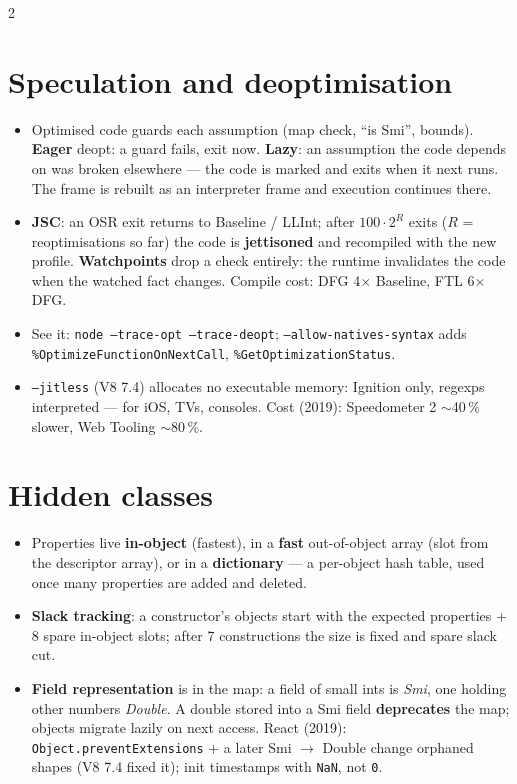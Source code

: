 \documentclass[8pt]{extarticle}
\newcommand\ct[1]{\texttt{#1}}
\begin{document}
\begin{multicols}{2}
\section{Speculation and deoptimisation}
\begin{itemize}
  \item Optimised code guards each assumption (map check, ``is Smi'', bounds). \textbf{Eager}
        deopt: a guard fails, exit now. \textbf{Lazy}: an assumption the code depends on was
        broken elsewhere — the code is marked and exits when it next runs. The frame is
        rebuilt as an interpreter frame and execution continues there.
  \item \textbf{JSC}: an OSR exit returns to Baseline / LLInt; after $100 \cdot 2^R$ exits ($R$ =
        reoptimisations so far) the code is \textbf{jettisoned} and recompiled with the new
        profile. \textbf{Watchpoints} drop a check entirely: the runtime invalidates the code
        when the watched fact changes. Compile cost: DFG 4$\times$ Baseline, FTL 6$\times$ DFG.
  \item See it: \ct{node --trace-opt --trace-deopt}; \ct{--allow-natives-syntax} adds
        \ct{\%OptimizeFunctionOnNextCall}, \ct{\%GetOptimizationStatus}.
  \item \ct{--jitless} (V8 7.4) allocates no executable memory: Ignition only, regexps
        interpreted — for iOS, TVs, consoles. Cost (2019): Speedometer 2 $\sim$40\,\% slower, Web
        Tooling $\sim$80\,\%.
\end{itemize}

\section{Hidden classes}
\begin{itemize}
  \item Properties live \textbf{in-object} (fastest), in a \textbf{fast} out-of-object array
        (slot from the descriptor array), or in a \textbf{dictionary} — a per-object hash
        table, used once many properties are added and deleted.
  \item \textbf{Slack tracking}: a constructor's objects start with the expected properties
        + 8 spare in-object slots; after 7 constructions the size is fixed and spare slack cut.
  \item \textbf{Field representation} is in the map: a field of small ints is \emph{Smi}, one
        holding other numbers \emph{Double}. A double stored into a Smi field
        \textbf{deprecates} the map; objects migrate lazily on next access. React (2019):
        \ct{Object.preventExtensions} + a later Smi $\to$ Double change orphaned shapes (V8 7.4
        fixed it); init timestamps with \ct{NaN}, not \ct{0}.
\end{itemize}


\end{multicols}
\end{document}
